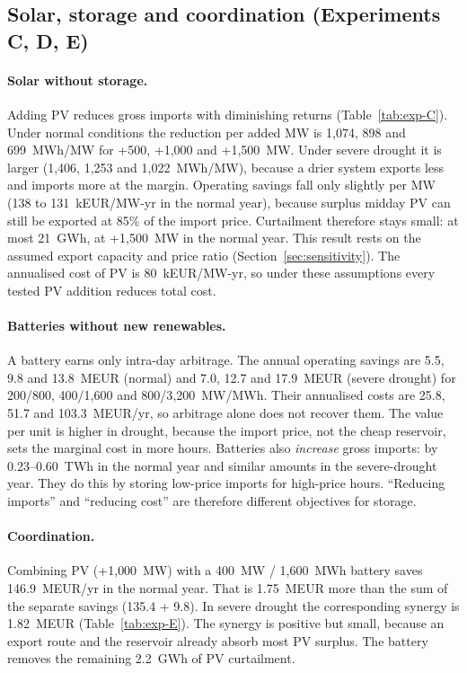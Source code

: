 

\subsection{Solar, storage and coordination (Experiments C, D, E)}
\paragraph{Solar without storage.} Adding PV reduces gross imports with diminishing returns
(Table~\ref{tab:exp-C}). Under normal conditions the reduction per added MW is 1{,}074, 898 and 699~MWh/MW
for +500, +1{,}000 and +1{,}500~MW. Under severe drought it is larger (1{,}406, 1{,}253 and 1{,}022~MWh/MW),
because a drier system exports less and imports more at the margin. Operating savings fall only slightly per
MW (138 to 131~kEUR/MW-yr in the normal year), because surplus midday PV can still be exported at 85\% of the
import price. Curtailment therefore stays small: at most 21~GWh, at +1{,}500~MW in the normal year. This
result rests on the assumed export capacity and price ratio (Section~\ref{sec:sensitivity}). The annualised
cost of PV is 80~kEUR/MW-yr, so under these assumptions every tested PV addition reduces total cost.

\paragraph{Batteries without new renewables.} A battery earns only intra-day arbitrage. The annual operating
savings are 5.5, 9.8 and 13.8~MEUR (normal) and 7.0, 12.7 and 17.9~MEUR (severe drought) for
200/800, 400/1{,}600 and 800/3{,}200~MW/MWh. Their annualised costs are 25.8, 51.7 and 103.3~MEUR/yr, so
arbitrage alone does not recover them. The value per unit is higher in drought, because the import price, not
the cheap reservoir, sets the marginal cost in more hours. Batteries also \emph{increase} gross imports: by
0.23--0.60~TWh in the normal year and similar amounts in the severe-drought year. They do this by storing
low-price imports for high-price hours. ``Reducing imports'' and ``reducing cost'' are therefore different
objectives for storage.

\paragraph{Coordination.} Combining PV (+1{,}000~MW) with a 400~MW / 1{,}600~MWh battery saves 146.9~MEUR/yr
in the normal year. That is 1.75~MEUR more than the sum of the separate savings (135.4 + 9.8). In severe
drought the corresponding synergy is 1.82~MEUR (Table~\ref{tab:exp-E}). The synergy is positive but small,
because an export route and the reservoir already absorb most PV surplus. The battery removes the remaining
2.2~GWh of PV curtailment.

